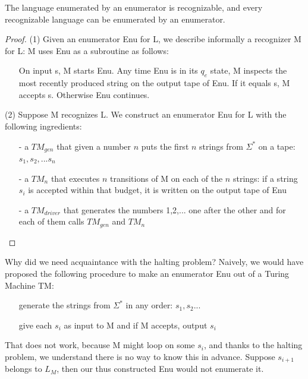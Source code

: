 \begin{theorem}
The language enumerated by an enumerator is recognizable, and every
recognizable language can be enumerated by an enumerator.
\end{theorem}
\begin{proof}
(1) Given an enumerator Enu for L, we describe informally a recognizer
  M for L: M uses Enu as a subroutine as follows:
\begin{itemize}
\item[]
On input s, M starts Enu. Any time Enu is in its $q_e$ state, M
inspects the most recently produced string on the output tape of
Enu. If it equals s, M accepts s. Otherwise Enu continues.
\end{itemize}

(2) Suppose M recognizes L. We construct an enumerator Enu for L with the following ingredients:

\begin{itemize}
\item[-]
a $TM_{gen}$ that given a number $n$ puts the first $n$
strings from $\Sigma^*$ on a tape: $s_1, s_2, ... s_n$

\item[-]
a $TM_n$ that executes $n$ transitions
of M on each of the $n$ strings: if a string $s_i$ is accepted within that budget, it is written
on the output tape of Enu

\item[-]
a $TM_{driver}$ that generates the numbers 1,2,... one after the
other and for each of them calls $TM_{gen}$ and $TM_n$

\end{itemize}
\end{proof}

Why did we need acquaintance with the halting problem? Naively, we
would have proposed the following procedure to make an enumerator Enu
out of a Turing Machine TM:

\begin{itemize}
\item[]
generate the strings from $\Sigma^*$ in any order:
$s_1, s_2...$

\item[]
give each $s_i$ as input to M and if M accepts, output $s_i$
\end{itemize}

That does not work, because M might loop on some $s_i$, and thanks to
the halting problem, we understand there is no way to know this in
advance. Suppose $s_{i+1}$ belongs to $L_M$, then our thus constructed
Enu would not enumerate it.



